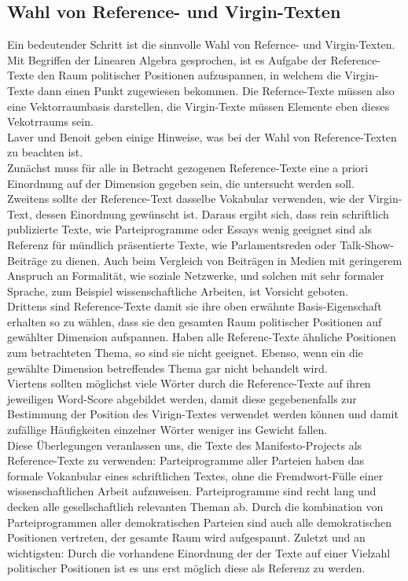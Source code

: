   \subsection{Wahl von Reference- und Virgin-Texten}
  Ein bedeutender Schritt ist die sinnvolle Wahl von Refernce- und Virgin-Texten. Mit Begriffen der Linearen Algebra gesprochen, ist es Aufgabe der Reference-Texte den Raum politischer Positionen aufzuspannen, in welchem die Virgin-Texte dann einen Punkt zugewiesen bekommen. Die Refernce-Texte müssen also eine Vektorraumbasis darstellen, die Virgin-Texte müssen Elemente eben dieses Vekotrraums sein. \\
  Laver und Benoit \cite{LuB} geben einige Hinweise, was bei der Wahl von Reference-Texten zu beachten ist. \\
  Zunächst muss für alle in Betracht gezogenen Reference-Texte eine a priori Einordnung auf der Dimension gegeben sein, die untersucht werden soll. \\
  Zweitens sollte der Reference-Text dasselbe Vokabular verwenden, wie der Virgin-Text, dessen Einordnung gewünscht ist. Daraus ergibt sich, dass rein schriftlich publizierte Texte, wie Parteiprogramme oder Essays wenig geeignet sind als Referenz für mündlich präsentierte Texte, wie Parlamentsreden oder Talk-Show-Beiträge zu dienen. Auch beim Vergleich von Beiträgen in Medien mit geringerem Anspruch an Formalität, wie soziale Netzwerke, und solchen mit sehr formaler Sprache, zum Beispiel wissenschaftliche Arbeiten, ist Vorsicht geboten. \\
  Drittens sind Reference-Texte damit sie ihre oben erwähnte Basis-Eigenschaft erhalten so zu wählen, dass sie den gesamten Raum politischer Positionen auf gewählter Dimension aufspannen. Haben alle Referenc-Texte ähnliche Positionen zum betrachteten Thema, so sind sie nicht geeignet. Ebenso, wenn ein die gewählte Dimension betreffendes Thema gar nicht behandelt wird.  \\
  Viertens sollten möglichst viele Wörter durch die Reference-Texte auf ihren jeweiligen Word-Score abgebildet werden, damit diese gegebenenfalls zur Bestimmung der Position des Virign-Textes verwendet werden können und damit zufällige Häufigkeiten einzelner Wörter weniger ins Gewicht fallen.  \\
  Diese Überlegungen veranlassen uns, die Texte des Manifesto-Projects als Reference-Texte zu verwenden: Parteiprogramme aller Parteien haben das formale Vokanbular eines schriftlichen Textes, ohne die Fremdwort-Fülle einer wissenschaftlichen Arbeit aufzuweisen. Parteiprogramme sind recht lang und decken alle gesellschaftlich relevanten Theman ab. Durch die kombination von Parteiprogrammen aller demokratischen Parteien sind auch alle demokratischen Positionen vertreten, der gesamte Raum wird aufgespannt. Zuletzt und an wichtigsten: Durch die vorhandene Einordnung der der Texte auf einer Vielzahl politischer Positionen ist es uns erst möglich diese als Referenz zu werden. 
  
